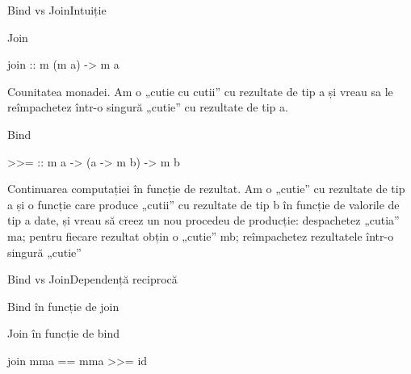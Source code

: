 \documentclass[xcolor=pdftex,romanian,colorlinks]{beamer}
\begin{document}
\begin{frame}[fragile]{Bind vs Join}{Intuiție}
\begin{block}{Join}
\begin{asciihs}
  join :: m (m a) -> m a
\end{asciihs}
Counitatea monadei. Am o „cutie cu cutii” cu rezultate de tip a și vreau sa le reîmpachetez într-o singură „cutie” cu rezultate de tip a.
\end{block}

\begin{block}{Bind}
\begin{asciihs}
  >>= :: m a -> (a -> m b) -> m b
\end{asciihs}
Continuarea computației în funcție de rezultat.
Am o „cutie” cu rezultate de tip a și o funcție care produce „cutii” cu rezultate de tip b în funcție de valorile de tip a date, și vreau să creez un nou procedeu de producție: despachetez „cutia” ma; pentru fiecare rezultat obțin  
o „cutie” mb; reîmpachetez rezultatele într-o singură „cutie”
\end{block}
\end{frame}
%
%
%
%

\begin{frame}[fragile]{Bind vs Join}{Dependență reciprocă}
\begin{block}{Bind în funcție de join}
\end{block}

\begin{block}{Join în funcție de bind}
\begin{asciihs}
   join mma == mma >>= id
\end{asciihs}
\end{block}

\end{frame}
\end{document}
